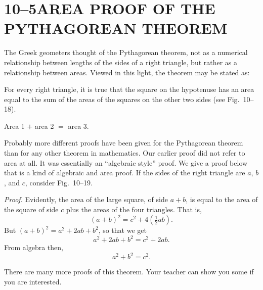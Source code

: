 \documentclass[11pt]{book}
\begin{document}
\section*{10--5\quad AREA PROOF OF THE\\PYTHAGOREAN THEOREM}

The Greek geometers thought of the Pythagorean theorem, not as a numerical
relationship between lengths of the sides of a right triangle, but rather as a
relationship between areas. Viewed in this light, the theorem may be stated as:

\begin{theorem}
For every right triangle, it is true that the square on the hypotenuse has
an area equal to the sum of the areas of the squares on the other two sides
(see Fig.~10--18).
\end{theorem}

\FIGXEIGHTEENNINETEEN

\begin{center}
Area 1 $+$ area 2 $=$ area 3.
\end{center}

Probably more different proofs have been given for the Pythagorean theorem than
for any other theorem in mathematics. Our earlier proof did not refer to area
at all. It was essentially an ``algebraic style'' proof. We give a proof below
that is a kind of algebraic and area proof. If the sides of the right triangle
are $a$, $b$, and $c$, consider Fig.~10--19.

\noindent\emph{Proof.} Evidently, the area of the large square, of side
$a + b$, is equal to the area of the square of side $c$ plus the areas of the
four triangles. That is,
\[ (a + b)^2 = c^2 + 4(\tfrac{1}{2}ab). \]
But $(a + b)^2 = a^2 + 2ab + b^2$, so that we get
\[ a^2 + 2ab + b^2 = c^2 + 2ab. \]
From algebra then,
\[ a^2 + b^2 = c^2. \]

There are many more proofs of this theorem. Your teacher can show you some if
you are interested.
\end{document}

